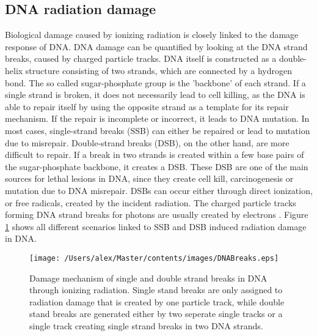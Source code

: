 \subsection{DNA radiation damage}
Biological damage caused by ionizing radiation is closely linked to the damage response of DNA. DNA damage can be quantified by looking at the DNA strand breaks, caused by charged particle tracks. DNA itself is constructed as a double-helix structure consisting of two strands, which are connected by a hydrogen bond. The so called sugar-phosphate group is the 'backbone' of each strand. If a single strand is broken, it does not necessarily lead to cell killing, as the DNA is able to repair itself by using the opposite strand as a template for its repair mechanism. If the repair is incomplete or incorrect, it leads to DNA mutation. In most cases, single-strand breaks (SSB) can either be repaired or lead to mutation due to misrepair. Double-strand breaks (DSB), on the other hand, are more difficult to repair. If a break in two strands is created within a few base pairs of the sugar-phosphate backbone, it creates a DSB. These DSB are one of the main sources for lethal lesions in DNA, since they create cell kill, carcinogenesis or mutation due to DNA misrepair. DSBs can occur either through direct ionization, or free radicals, created by the incident radiation. The charged particle tracks forming DNA strand breaks for photons are usually created by electrons \cite{Alper}. Figure \ref{fig:DNABreaks} shows all different scenarios linked to SSB and DSB induced radiation damage in DNA. 
\begin{figure}[ht]
\centering
\texttt{[image: /Users/alex/Master/contents/images/DNABreaks.eps]}
\caption{Damage mechanism of single and double strand breaks in DNA through ionizing radiation. Single stand breaks are only assigned to radiation damage that is created by one particle track, while double stand breaks are generated either by two seperate single tracks or a single track creating single strand breaks in two DNA strands. }
\label{fig:DNABreaks}
\end{figure}
